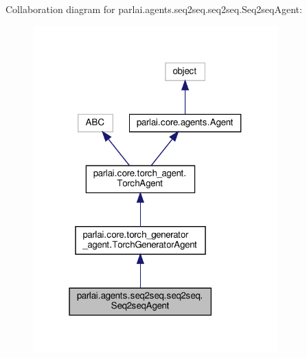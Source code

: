 Collaboration diagram for parlai.\+agents.\+seq2seq.\+seq2seq.\+Seq2seq\+Agent\+:
\nopagebreak
\begin{figure}[H]
\begin{center}
\leavevmode
\includegraphics[width=268pt]{d8/db0/classparlai_1_1agents_1_1seq2seq_1_1seq2seq_1_1Seq2seqAgent__coll__graph}
\end{center}
\end{figure}
